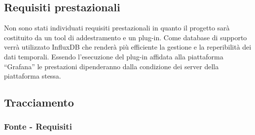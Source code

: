 \pagebreak
	\subsection{Requisiti prestazionali}{
Non sono stati individuati requisiti prestazionali in quanto il progetto sarà costituito da un tool di addestramento e un plug-in. Come database di supporto verrà utilizzato InfluxDB che renderà più efficiente la gestione e la reperibilità dei dati temporali. Essendo l'esecuzione del plug-in affidata alla piattaforma “Grafana”  le prestazioni dipenderanno dalla condizione dei server della piattaforma stessa.}


	\subsection{Tracciamento}
		
		\subsubsection{Fonte - Requisiti}


